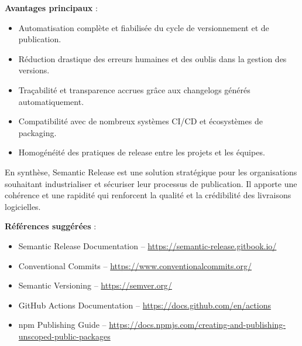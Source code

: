 \textbf{Avantages principaux} :
\begin{itemize}
	\item Automatisation complète et fiabilisée du cycle de versionnement et de publication.
	\item Réduction drastique des erreurs humaines et des oublis dans la gestion des versions.
	\item Traçabilité et transparence accrues grâce aux changelogs générés automatiquement.
	\item Compatibilité avec de nombreux systèmes CI/CD et écosystèmes de packaging.
	\item Homogénéité des pratiques de release entre les projets et les équipes.
\end{itemize}

En synthèse, Semantic Release est une solution stratégique pour les organisations souhaitant industrialiser et sécuriser leur processus de publication. Il apporte une cohérence et une rapidité qui renforcent la qualité et la crédibilité des livraisons logicielles.

\textbf{Références suggérées} :
\begin{itemize}
	\item Semantic Release Documentation – \url{https://semantic-release.gitbook.io/}
	\item Conventional Commits – \url{https://www.conventionalcommits.org/}
	\item Semantic Versioning – \url{https://semver.org/}
	\item GitHub Actions Documentation – \url{https://docs.github.com/en/actions}
	\item npm Publishing Guide – \url{https://docs.npmjs.com/creating-and-publishing-unscoped-public-packages}
\end{itemize}